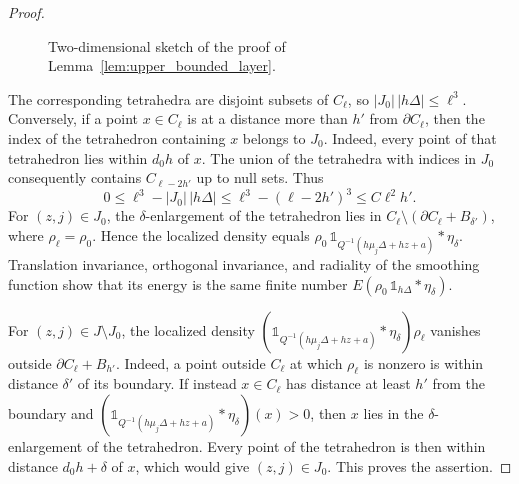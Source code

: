\documentclass[final,reqno]{amsart}
\theoremstyle{remark}
\theoremstyle{definition}
\renewcommand{\le}{\leqslant}
\newcommand{\iden}{\mathbb{1}}
\newcommand{\tetra}{\mathbb{\Delta}}
\begin{document}
\begin{proof}
\begin{figure}[ht]
\caption{Two-dimensional sketch of the proof of Lemma~\ref{lem:upper_bounded_layer}.}
\label{fig:bounded_layer}
\end{figure}

The corresponding tetrahedra are disjoint subsets of $C_\ell$, so
$|J_0|\,|h\tetra|\le \ell^3$.
Conversely, if a point $x\in C_\ell$ is at a distance more than $h'$ from $\partial C_\ell$, then the index of the tetrahedron containing $x$ belongs to $J_0$. Indeed, every point of that tetrahedron lies within $d_0h$ of $x$. The union of the tetrahedra with indices in $J_0$ consequently contains $C_{\ell-2h'}$ up to null sets. Thus
\begin{equation}\label{eq:upper_interior_count}
0\le \ell^3-|J_0|\,|h\tetra|
\le \ell^3-(\ell-2h')^3
\le C \ell^2h'.
\end{equation}
For $(z,j)\in J_0$, the $\delta$-enlargement of the tetrahedron lies in $C_\ell\setminus(\partial C_\ell+B_{\delta'})$, where $\rho_\ell=\rho_0$. Hence the localized density equals $\rho_0\,\iden_{Q^{-1}(h\mu_j\tetra+h z+a)}*\eta_\delta$. Translation invariance, orthogonal invariance, and radiality of the smoothing function show that its energy is the same finite number $E(\rho_0\,\iden_{h\tetra}*\eta_\delta)$.

For $(z,j)\in J\setminus J_0$, the localized density $(\iden_{Q^{-1}(h\mu_j\tetra+h z+a)}*\eta_\delta)\rho_\ell$ vanishes outside $\partial C_\ell+B_{h'}$. Indeed, a point outside $C_\ell$ at which $\rho_\ell$ is nonzero is within distance $\delta'$ of its boundary. If instead $x\in C_\ell$ has distance at least $h'$ from the boundary and $(\iden_{Q^{-1}(h\mu_j\tetra+h z+a)}*\eta_\delta)(x)>0$, then $x$ lies in the $\delta$-enlargement of the tetrahedron. Every point of the tetrahedron is then within distance $d_0h+\delta$ of $x$, which would give $(z,j)\in J_0$. This proves the assertion.


\end{proof}
\end{document}

